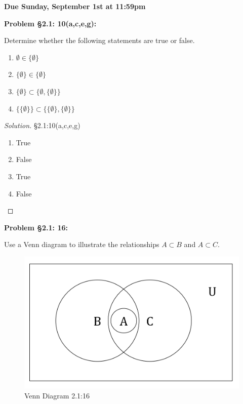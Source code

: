 \documentclass{article}
\newenvironment{solution}{\begin{proof}[Solution]}{\end{proof}}
\newenvironment{problem}[1]
{\begin{mdframed}[default]
\textbf{Problem #1:}
}
{\end{mdframed}
}
\begin{document}
\textbf{Due Sunday, September 1st at 11:59pm}
\begin{problem}{\S 2.1: 10(a,c,e,g)}
Determine whether the following statements are true or false.
\begin{enumerate}
\item[(a)] $\emptyset \in \{ \emptyset \}$ 
\item[(c)] $\{ \emptyset \} \in \{ \emptyset \}$ 
\item[(e)] $\{ \emptyset \} \subset \{ \emptyset, \{ \emptyset \} \}$ 
\item[(g)] $\{ \{ \emptyset \} \} \subset \{ \{ \emptyset \}, \{ \emptyset \} \}$ 
\end{enumerate}
\begin{solution}{\S2.1:10(a,c,e,g)}
    \begin{enumerate}
\item[(a)]True
\item[(c)]False
\item[(e)]True
\item[(g)]False
    \end{enumerate}
\end{solution}
\end{problem}
\begin{problem}{\S 2.1: 16}
Use a Venn diagram to illustrate the relationships $A \subset B$ and $A \subset C$.

\end{problem}
\begin{figure}[h]
    \centering
    \includegraphics[width=0.35\linewidth]{Venen.png}
        \caption{Venn Diagram 2.1:16}
    \label{fig:enter-label}
\end{figure}
\end{document}

